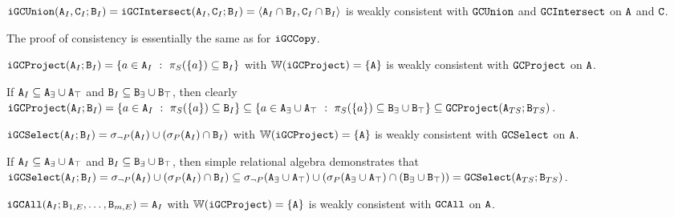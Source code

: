 \begin{example}
$\tt{iGCUnion}(\tt{A}_I, \tt{C}_I; \tt{B}_I) = \tt{iGCIntersect}(\tt{A}_I, \tt{C}_I; \tt{B}_I) = \langle \tt{A}_I \cap \tt{B}_I, \tt{C}_I \cap \tt{B}_I \rangle$ is weakly consistent with $\tt{GCUnion}$ and $\tt{GCIntersect}$ on $\tt{A}$ and $\tt{C}$.
\end{example}
The proof of consistency is essentially the same as for $\tt{iGCCopy}$.

\begin{example}[Project GC]
$\tt{iGCProject}(\tt{A}_I; \tt{B}_I) = \{a \in \tt{A}_I ~:~ \pi_S(\{a\}) \subseteq \tt{B}_I\}$ with $\mathbb{W}(\tt{iGCProject}) = \{\tt{A}\}$ is weakly consistent with $\tt{GCProject}$ on $\tt{A}$.
\end{example}

If $\tt{A}_I \subseteq \tt{A}_\exists \cup \tt{A}_\top$ and $\tt{B}_I \subseteq \tt{B}_\exists \cup \tt{B}_\top$, then
clearly $\tt{iGCProject}(\tt{A}_I; \tt{B}_I) = \{a \in \tt{A}_I ~:~ \pi_S(\{a\}) \subseteq \tt{B}_I\} \subseteq \{a \in \tt{A}_\exists \cup \tt{A}_\top ~:~ \pi_S(\{a\}) \subseteq \tt{B}_\exists \cup \tt{B}_\top\} \subseteq \tt{GCProject}(\tt{A}_{TS}; \tt{B}_{TS})$.

\begin{example}[Select GC]
$\tt{iGCSelect}(\tt{A}_I; \tt{B}_I) = \sigma_{\neg P}(\tt{A}_I) \cup (\sigma_P(\tt{A}_I) \cap \tt{B}_I)$ with $\mathbb{W}(\tt{iGCProject}) = \{\tt{A}\}$ is weakly consistent with $\tt{GCSelect}$ on $\tt{A}$.
\end{example}
If $\tt{A}_I \subseteq \tt{A}_\exists \cup \tt{A}_\top$ and $\tt{B}_I \subseteq \tt{B}_\exists \cup \tt{B}_\top$, then
simple relational algebra demonstrates that
$\tt{iGCSelect}(\tt{A}_I; \tt{B}_I) = \sigma_{\neg P}(\tt{A}_I) \cup (\sigma_P(\tt{A}_I) \cap \tt{B}_I) \subseteq \sigma_{\neg P}(\tt{A}_\exists \cup \tt{A}_\top) \cup (\sigma_P(\tt{A}_\exists \cup \tt{A}_\top) \cap (\tt{B}_\exists \cup \tt{B}_\top)) = \tt{GCSelect}(\tt{A}_{TS}; \tt{B}_{TS})$.

\begin{example}[Linear GC]
$\tt{iGCAll}(\tt{A}_I; \tt{B}_{1,E}, \dots, \tt{B}_{m,E}) = \tt{A}_I$ with $\mathbb{W}(\tt{iGCProject}) = \{\tt{A}\}$ is weakly consistent with $\tt{GCAll}$ on $\tt{A}$.
\end{example}


